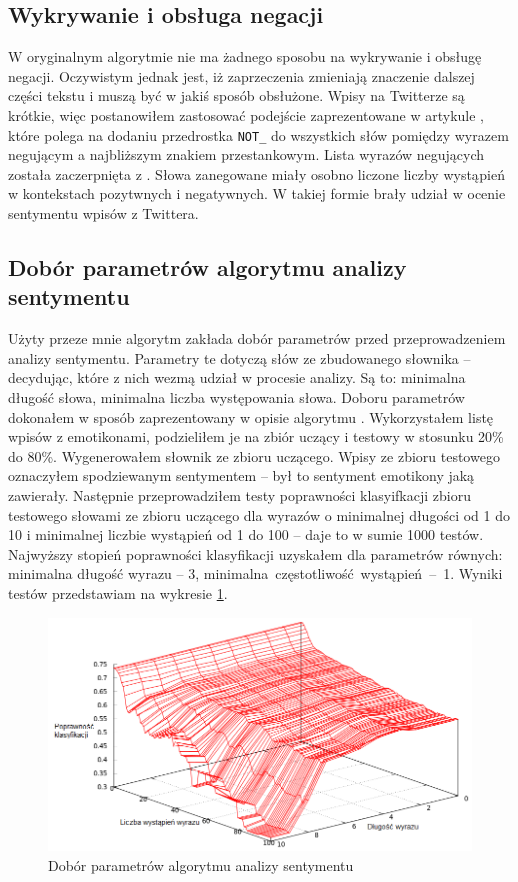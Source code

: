 \subsection{Wykrywanie i obsługa negacji}
\label{subsubsection:wykrywanieiobsluganegacji}
W oryginalnym algorytmie  nie ma żadnego sposobu na
wykrywanie i obsługę negacji. Oczywistym jednak jest, iż zaprzeczenia zmieniają
znaczenie dalszej części tekstu i muszą być w jakiś sposób obsłużone.
Wpisy na Twitterze są krótkie, więc postanowiłem zastosować podejście
zaprezentowane w artykule \cite{thumbsUp2002}, które polega na dodaniu
przedrostka \texttt{NOT\_} do wszystkich słów pomiędzy wyrazem negującym
a najbliższym znakiem przestankowym. Lista wyrazów negujących
została zaczerpnięta z \cite{englishNots1983}. Słowa zanegowane miały osobno
liczone liczby wystąpień w kontekstach pozytwnych i negatywnych. W takiej formie
brały udział w ocenie sentymentu wpisów z Twittera.







\subsection{Dobór parametrów algorytmu analizy sentymentu}
\label{subsubsection:doborparametrow}
Użyty przeze mnie algorytm zakłada dobór parametrów przed przeprowadzeniem
analizy sentymentu. Parametry te dotyczą słów ze zbudowanego słownika --
decydując, które z nich wezmą udział w procesie analizy. Są to: minimalna
długość słowa, minimalna liczba występowania słowa. Doboru parametrów dokonałem
w sposób zaprezentowany w opisie algorytmu .
Wykorzystałem listę wpisów z emotikonami, podzieliłem je na zbiór uczący i
testowy w stosunku 20\% do 80\%.
Wygenerowałem słownik ze zbioru uczącego. Wpisy ze zbioru testowego oznaczyłem
spodziewanym sentymentem -- był to sentyment emotikony jaką zawierały. Następnie
przeprowadziłem testy poprawności klasyifkacji zbioru testowego słowami ze
zbioru uczącego dla wyrazów o minimalnej długości od 1 do 10 i minimalnej
liczbie wystąpień od 1 do 100 -- daje to w sumie 1000 testów.
Najwyższy stopień poprawności klasyfikacji uzyskałem dla parametrów równych:
minimalna długość wyrazu -- 3, \mbox{minimalna częstotliwość wystąpień -- 1}.
Wyniki testów przedstawiam na wykresie \ref{image:pak-paroubek-parametry}.

\begin{figure}[ht!]
\centering
\includegraphics[width=160mm]{img/pak-paroubek-params_pl.png}
\caption{Dobór parametrów algorytmu analizy sentymentu}
\label{image:pak-paroubek-parametry}
\end{figure}